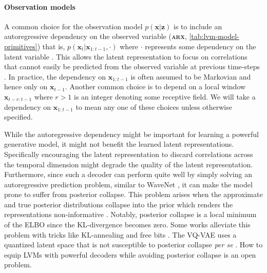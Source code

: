 {\paragraph{Observation models} 
A common choice for the observation model $p(\mathbf{x}|\mathbf{z})$ is to include an autoregressive dependency on the observed variable (\textbf{\textsc{arx}}, \cref{tab:lvm-model-primitives}) that is, $p(\mathbf{x}_t|\mathbf{x}_{1:t-1}, \cdot)$ where $\cdot$ represents some dependency on the latent variable \parencite{chung_recurrent_2015, fraccaro_sequential_2016, oord_neural_2018, oord_representation_2018}. This allows the latent representation to focus on correlations that cannot easily be predicted from the observed variable at previous time-steps \parencite{oord_representation_2018}. In practice, the dependency on $\mathbf{x}_{1:t-1}$ is often assumed to be Markovian and hence only on $\mathbf{x}_{t-1}$. Another common choice is to depend on a local window $\mathbf{x}_{t-r:t-1}$ where $r>1$ is an integer denoting some receptive field. We will take a dependency on $\mathbf{x}_{1:t-1}$ to mean any one of these choices unless otherwise specified.

While the autoregressive dependency might be important for learning a powerful generative model, it might not benefit the learned latent representations. Specifically encouraging the latent representation to discard correlations across the temporal dimension might degrade the quality of the latent representation.
Furthermore, since such a decoder can perform quite well by simply solving an autoregressive prediction problem, similar to WaveNet \parencite{oord_wavenet_2016}, it can make the model prone to suffer from posterior collapse. This problem arises when the approximate and true posterior distributions collapse into the prior which renders the representations non-informative \parencite{bowman_generating_2016, sonderby_ladder_2016}. Notably, posterior collapse is a local minimum of the ELBO since the KL-divergence becomes zero. 
Some works alleviate this problem with tricks like KL-annealing and free bits \parencite{bowman_generating_2016, sonderby_ladder_2016, kingma_improved_2016}. 
The VQ-VAE uses a quantized latent space that is not susceptible to posterior collapse \textit{per se} \parencite{oord_neural_2018}. How to equip LVMs with powerful decoders while avoiding posterior collapse is an open problem.

}
